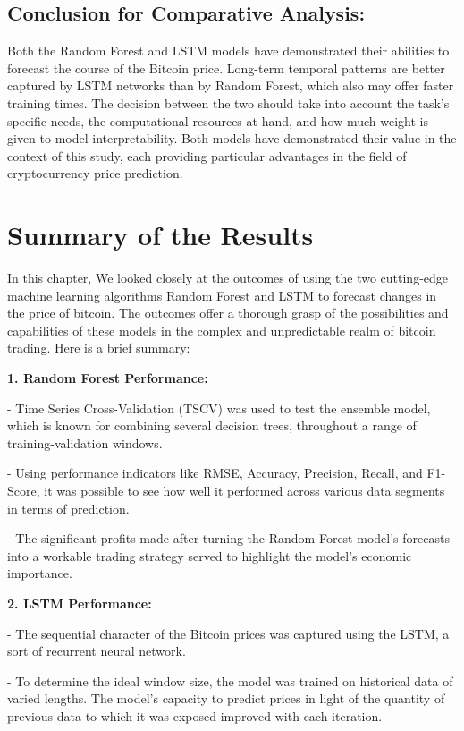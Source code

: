 \subsection{Conclusion for Comparative Analysis:}

Both the Random Forest and LSTM models have demonstrated their abilities to forecast the course of the Bitcoin price. Long-term temporal patterns are better captured by LSTM networks than by Random Forest, which also may offer faster training times. The decision between the two should take into account the task's specific needs, the computational resources at hand, and how much weight is given to model interpretability. Both models have demonstrated their value in the context of this study, each providing particular advantages in the field of cryptocurrency price prediction.

\section{Summary of the Results}

In this chapter, We looked closely at the outcomes of using the two cutting-edge machine learning algorithms Random Forest and LSTM to forecast changes in the price of bitcoin. The outcomes offer a thorough grasp of the possibilities and capabilities of these models in the complex and unpredictable realm of bitcoin trading. Here is a brief summary:

\textbf{1.	Random Forest Performance:}

-	Time Series Cross-Validation (TSCV) was used to test the ensemble model, which is known for combining several decision trees, throughout a range of training-validation windows.

-	Using performance indicators like RMSE, Accuracy, Precision, Recall, and F1-Score, it was possible to see how well it performed across various data segments in terms of prediction.

-	The significant profits made after turning the Random Forest model's forecasts into a workable trading strategy served to highlight the model's economic importance.

\textbf{2.	LSTM Performance:}

-	The sequential character of the Bitcoin prices was captured using the LSTM, a sort of recurrent neural network.

-	To determine the ideal window size, the model was trained on historical data of varied lengths. The model's capacity to predict prices in light of the quantity of previous data to which it was exposed improved with each iteration.

